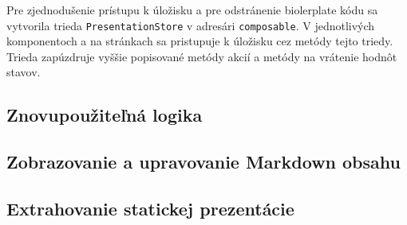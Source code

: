 Pre zjednodušenie prístupu k úložisku a pre odstránenie biolerplate kódu sa vytvorila trieda \texttt{PresentationStore} v adresári \texttt{composable}. V jednotlivých komponentoch a na stránkach sa pristupuje k úložisku cez metódy tejto triedy. Trieda zapúzdruje vyššie popisované metódy akcií a metódy na vrátenie hodnôt stavov.

\subsection{Znovupoužiteľná logika}

\subsection{Zobrazovanie a upravovanie Markdown obsahu}

\subsection{Extrahovanie statickej prezentácie}